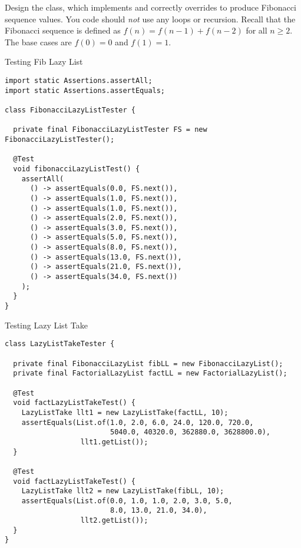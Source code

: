 Design the  class, which implements  and correctly overrides  to produce Fibonacci sequence values. You code should \textit{not} use any loops or recursion. Recall that the Fibonacci sequence is defined as $f(n) = f(n-1)+f(n-2)$ for all $n\geq{2}$. The base cases are $f(0)=0$ and $f(1)=1$.

\begin{cl}{Testing Fib Lazy List}
\begin{lstlisting}[language=MyJava]
import static Assertions.assertAll;
import static Assertions.assertEquals;

class FibonacciLazyListTester {

  private final FibonacciLazyListTester FS = new FibonacciLazyListTester();

  @Test
  void fibonacciLazyListTest() {
    assertAll(
      () -> assertEquals(0.0, FS.next()),
      () -> assertEquals(1.0, FS.next()),
      () -> assertEquals(1.0, FS.next()),
      () -> assertEquals(2.0, FS.next()),
      () -> assertEquals(3.0, FS.next()),
      () -> assertEquals(5.0, FS.next()),
      () -> assertEquals(8.0, FS.next()),
      () -> assertEquals(13.0, FS.next()),
      () -> assertEquals(21.0, FS.next()),
      () -> assertEquals(34.0, FS.next())
    );
  }
}
\end{lstlisting}
\end{cl}


\begin{cl}{Testing Lazy List Take}
\begin{lstlisting}[language=MyJava]
class LazyListTakeTester {

  private final FibonacciLazyList fibLL = new FibonacciLazyList();
  private final FactorialLazyList factLL = new FactorialLazyList();

  @Test
  void factLazyListTakeTest() {
    LazyListTake llt1 = new LazyListTake(factLL, 10);
    assertEquals(List.of(1.0, 2.0, 6.0, 24.0, 120.0, 720.0,
                         5040.0, 40320.0, 362880.0, 3628800.0),
                  llt1.getList());
  }

  @Test
  void factLazyListTakeTest() {
    LazyListTake llt2 = new LazyListTake(fibLL, 10);
    assertEquals(List.of(0.0, 1.0, 1.0, 2.0, 3.0, 5.0,
                         8.0, 13.0, 21.0, 34.0),
                  llt2.getList());
  }
}
\end{lstlisting}
\end{cl}

